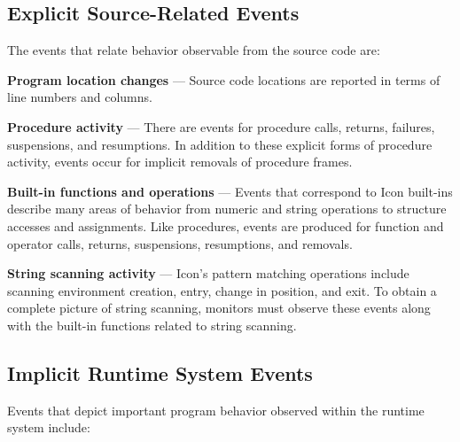 \subsection*{Explicit Source-Related Events}

The events that relate behavior observable from the source code are:

\begin{list}{}{\itemsep 7pt} %
\item [{\bf Program location changes}] --- Source code locations are
	reported in terms of line numbers and columns.
\item [{\bf Procedure activity}] --- There are events for procedure calls,
	returns, failures, suspensions,
	and resumptions.  In addition to these explicit forms of
	procedure activity, events occur for implicit removals of
	procedure frames.
\item [{\bf Built-in functions and operations}] --- Events that correspond
	to Icon built-ins describe many areas of behavior from numeric and
	string operations to structure accesses	and assignments.
	Like procedures, events are produced for function and operator calls,
	returns, suspensions, resumptions, and removals.
\item [{\bf String scanning activity}] --- Icon's pattern matching
	operations include scanning environment
	creation, entry, change in position, and exit.  To obtain
	a complete picture of string scanning, monitors must
	observe these events along with the built-in functions
	related to string scanning.
\end{list}

\subsection*{Implicit Runtime System Events}

Events that depict important program behavior observed within the runtime
system include:

